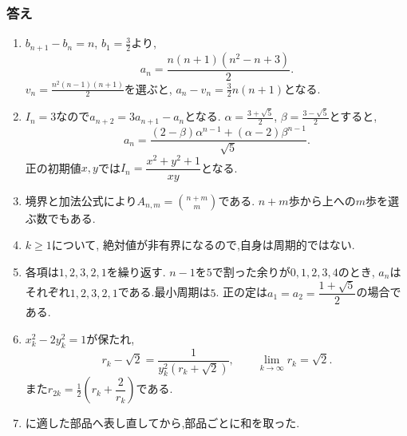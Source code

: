   \subsubsection{答え}
  \begin{enumerate}[label=\textbf{問\arabic*.},format=\bookitemlink{practice-connections}{answer}{problem}]
    \item $b_{n+1}-b_n=n$, $b_1=\frac32$より,
      \[
        a_n=\frac{n(n+1)(n^2-n+3)}2.
      \]
      $v_n=\frac{n^2(n-1)(n+1)}2$を選ぶと,
      $a_n-v_n=\frac32n(n+1)$となる.
    \item $I_n=3$なので$a_{n+2}=3a_{n+1}-a_n$となる.
      $\alpha=\frac{3+\sqrt5}{2}$, $\beta=\frac{3-\sqrt5}{2}$とすると,
      \[
        a_n=\frac{(2-\beta)\alpha^{n-1}+(\alpha-2)\beta^{n-1}}{\sqrt5}.
      \]
      正の初期値$x,y$では$I_n=\dfrac{x^2+y^2+1}{xy}$となる.
    \item 境界と加法公式により$A_{n,m}=\binom{n+m}{m}$である.
      $n+m$歩から上への$m$歩を選ぶ数でもある.
    \item $k\ge1$について,
      \BookMathLayout{\[
        a_{2k-1}=\frac{1+5(-2)^{k-1}}3,\qquad
        a_{2k}=-\frac{1+5(-2)^{k-1}}3.
      \]}{\[
    \begin{aligned}
      a_{2k-1}&=\frac{1+5(-2)^{k-1}}3,\\
      a_{2k}&=-\frac{1+5(-2)^{k-1}}3.
    \end{aligned}
  \]}
      絶対値が非有界になるので,自身は周期的ではない.
    \item 各項は$1,2,3,2,1$を繰り返す.
      $n-1$を$5$で割った余りが$0,1,2,3,4$のとき,
      $a_n$はそれぞれ$1,2,3,2,1$である.最小周期は$5$.
      正の定は$a_1=a_2=\dfrac{1+\sqrt5}{2}$の場合である.
    \item $x_k^2-2y_k^2=1$が保たれ,
      \[
        r_k-\sqrt2=\frac1{y_k^2(r_k+\sqrt2)},\qquad
        \lim_{k\to\infty}r_k=\sqrt2.
      \]
      また$r_{2k}=\frac12\left(r_k+\dfrac{2}{r_k}\right)$である.
    \item
      \BookMathLayout{\[
        \sum_{j=0}^{N-1}j^3
          =6\binom N4+6\binom N3+\binom N2
          =\frac{N^2(N-1)^2}{4}.
      \]}{\[
    \begin{aligned}
      \sum_{j=0}^{N-1}j^3&=6\binom N4+6\binom N3+\binom N2\\
      &=\frac{N^2(N-1)^2}{4}.
    \end{aligned}
  \]}
      に適した部品へ表し直してから,部品ごとに和を取った.
  \end{enumerate}


